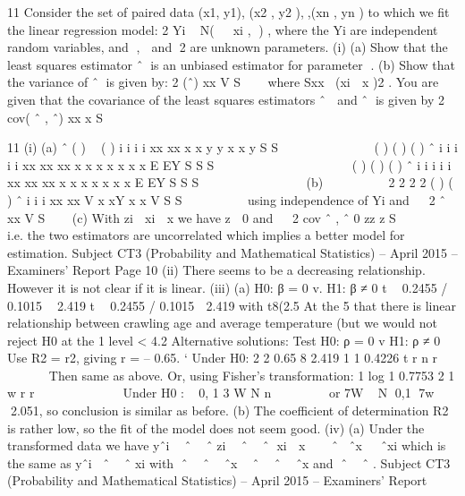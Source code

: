 \documentclass[a4paper,12pt]{article}
\begin{document}
\begin{enumerate}

11 Consider the set of paired data (x1, y1), (x2 , y2 ),,(xn , yn ) to which we fit the linear
regression model:
  2
Yi ~ N(  xi , ) ,
where the Yi are independent random variables, and ,  and 2 are unknown
parameters.
(i) (a) Show that the least squares estimator ˆ is an unbiased estimator for
parameter .
(b) Show that the variance of ˆ is given by:
  2
(ˆ)
xx
V
S

 
where Sxx (xi  x )2 .
You are given that the covariance of the least squares estimators ˆ  and ˆ is
given by
2
cov( ˆ , ˆ)
xx
x
S

11 (i) (a)
ˆ ( )  ( )
i i i i
xx xx
x x y y x x y
S S
  
    
    ( ) ( ) ( )
ˆ i i i i
i
xx xx xx
x x x x x x x
E EY
S S S
  
         
    ( ) ( ) ( )
ˆ i i i i
i
xx xx xx
x x x x x x x
E EY
S S S
  
         
(b)    
   
2 2
2 2
( ) ( )
ˆ i i i
xx xx
V x xY x x
V
S S
  
     using independence of Yi
and   2
ˆ
xx
V
S

 
(c) With zi  xi  x we have z  0 and   2
cov ˆ , ˆ 0
zz
z
S

   
i.e. the two estimators are uncorrelated which implies a better model
for estimation.
Subject CT3 (Probability and Mathematical Statistics) – April 2015 – Examiners’ Report
Page 10
(ii) There seems to be a decreasing relationship. However it is not clear if it is
linear.
(iii) (a) H0: β = 0 v. H1: β ≠ 0
t  0.2455 / 0.1015  2.419 t  0.2455 / 0.1015  2.419
with t8(2.5%
At the 5%
that there is linear relationship between crawling age and average
temperature (but we would not reject H0 at the 1%
             level < 4.2%
Alternative solutions:
  Test H0: ρ = 0 v H1: ρ ≠ 0
Use R2 = r2, giving r = – 0.65.
` Under H0:
  2
2 0.65 8 2.419
1 1 0.4226
t r n
r
 
  
 
Then same as above.
Or, using Fisher’s transformation:
  1 log 1 0.7753
2 1
w r
r
          
Under H0 :
  ~ 0, 1
3
W N
n
 
    
or 7W ~ N 0,1
7w  2.051, so conclusion is similar as before.
(b) The coefficient of determination R2 is rather low, so the fit of the
model does not seem good.
(iv) (a) Under the transformed data we have
yˆi  ˆ  ˆ zi  ˆ  ˆ xi  x   ˆ ˆx  ˆxi
which is the same as yˆi ˆ  ˆ xi with ˆ  ˆ  ˆx  ˆ  ˆ  ˆx and
ˆ  ˆ .
Subject CT3 (Probability and Mathematical Statistics) – April 2015 – Examiners’ Report

\end{enumerate}
\end{document}
